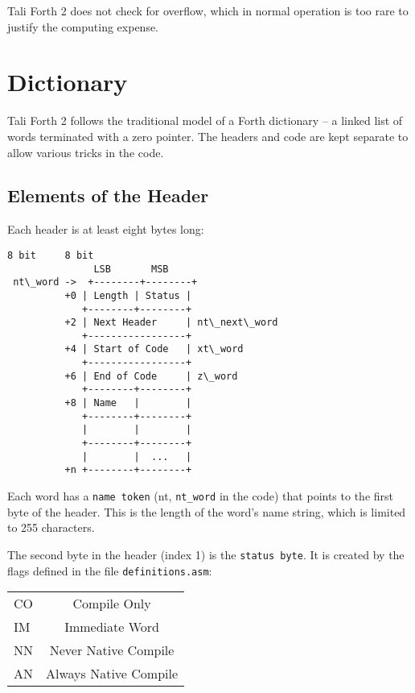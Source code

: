 Tali Forth 2 does not check for overflow, which in normal operation is too rare to
justify the computing expense. 

\section{Dictionary}


Tali Forth 2 follows the traditional model of a Forth dictionary -- a linked list
of words terminated with a zero pointer. The headers and code are kept separate
to allow various tricks in the code.


\subsection{Elements of the Header}

Each header is at least eight bytes long:

\begin{lstlisting}[frame=single]
              8 bit     8 bit
               LSB       MSB
 nt\_word ->  +--------+--------+
          +0 | Length | Status |
             +--------+--------+
          +2 | Next Header     | nt\_next\_word
             +-----------------+
          +4 | Start of Code   | xt\_word 
             +-----------------+
          +6 | End of Code     | z\_word
             +--------+--------+
          +8 | Name   |        |
             +--------+--------+
             |        |        |
             +--------+--------+
             |        |  ...   |
          +n +--------+--------+
\end{lstlisting}

Each word has a \texttt{name token} (nt, \texttt{nt\_word} in the code) that
points to the first byte of the header. This is the length of the word's name
string, which is limited to 255 characters. 

The second byte in the header (index 1) is the \texttt{status byte}. It is created by
the flags defined in the file \texttt{definitions.asm}: 

\begin{tabular}{ l c }
        CO & Compile Only\\
        IM & Immediate Word\\
        NN & Never Native Compile\\
        AN & Always Native Compile\\
\end{tabular}

